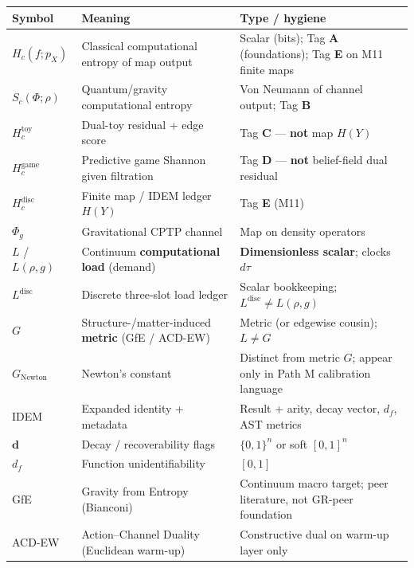 \documentclass[
  11pt,
]{article}
\newcounter{none} %
\begin{document}
{\def\LTcaptype{none} %
\begin{longtable}[]{@{}
  >{\raggedright\arraybackslash}p{}
  >{\raggedright\arraybackslash}p{}
  >{\raggedright\arraybackslash}p{}@{}}
\toprule\noalign{}
\begin{minipage}[b]{\linewidth}\raggedright
Symbol
\end{minipage} & \begin{minipage}[b]{\linewidth}\raggedright
Meaning
\end{minipage} & \begin{minipage}[b]{\linewidth}\raggedright
Type / hygiene
\end{minipage} \\
\midrule\noalign{}
\endhead
\bottomrule\noalign{}
\endlastfoot
\(H_c(f;p_X)\) & Classical computational entropy of map output & Scalar
(bits); Tag \textbf{A} (foundations); Tag \textbf{E} on M11 finite
maps \\
\(S_c(\Phi;\rho)\) & Quantum/gravity computational entropy & Von Neumann
of channel output; Tag \textbf{B} \\
\(H_c^{\mathrm{toy}}\) & Dual-toy residual + edge score & Tag \textbf{C}
--- \textbf{not} map \(H(Y)\) \\
\(H_c^{\mathrm{game}}\) & Predictive game Shannon given filtration & Tag
\textbf{D} --- \textbf{not} belief-field dual residual \\
\(H_c^{\mathrm{disc}}\) & Finite map / IDEM ledger \(H(Y)\) & Tag
\textbf{E} (M11) \\
\(\Phi_g\) & Gravitational CPTP channel & Map on density operators \\
\(L\) / \(L(\rho,g)\) & Continuum \textbf{computational load} (demand) &
\textbf{Dimensionless scalar}; clocks \(d\tau\) \\
\(L^{\mathrm{disc}}\) & Discrete three-slot load ledger & Scalar
bookkeeping; \(L^{\mathrm{disc}}\neq L(\rho,g)\) \\
\(G\) & Structure-/matter-induced \textbf{metric} (GfE / ACD-EW) &
Metric (or edgewise cousin); \textbf{\(L\neq G\)} \\
\(G_{\mathrm{Newton}}\) & Newton's constant & Distinct from metric
\(G\); appear only in Path M calibration language \\
IDEM & Expanded identity + metadata & Result + arity, decay vector,
\(d_f\), AST metrics \\
\(\mathbf{d}\) & Decay / recoverability flags & \(\{0,1\}^n\) or soft
\([0,1]^n\) \\
\(d_f\) & Function unidentifiability & \([0,1]\) \\
GfE & Gravity from Entropy (Bianconi) & Continuum macro target; peer
literature, not GR-peer foundation \\
ACD-EW & Action--Channel Duality (Euclidean warm-up) & Constructive dual
on warm-up layer only \\
\end{longtable}
}
\end{document}
